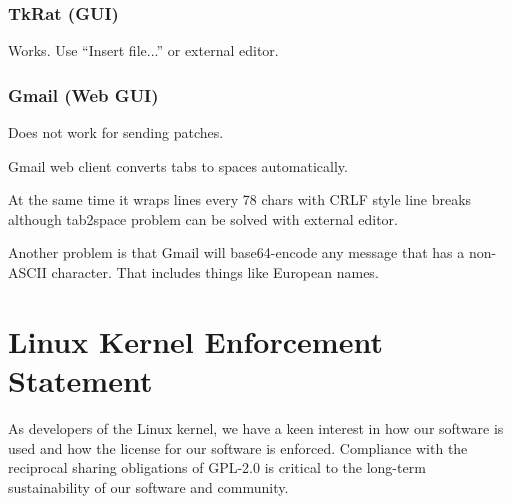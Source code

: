 \documentclass[a4paper,8pt,english]{sphinxmanual}
\begin{document}
\subsection{TkRat (GUI)}
\label{process/email-clients:tkrat-gui}
Works.  Use ``Insert file...'' or external editor.


\subsection{Gmail (Web GUI)}
\label{process/email-clients:gmail-web-gui}
Does not work for sending patches.

Gmail web client converts tabs to spaces automatically.

At the same time it wraps lines every 78 chars with CRLF style line breaks
although tab2space problem can be solved with external editor.

Another problem is that Gmail will base64-encode any message that has a
non-ASCII character. That includes things like European names.


\chapter{Linux Kernel Enforcement Statement}
\label{process/kernel-enforcement-statement:linux-kernel-enforcement-statement}\label{process/kernel-enforcement-statement::doc}
As developers of the Linux kernel, we have a keen interest in how our software
is used and how the license for our software is enforced.  Compliance with the
reciprocal sharing obligations of GPL-2.0 is critical to the long-term
sustainability of our software and community.
\end{document}
